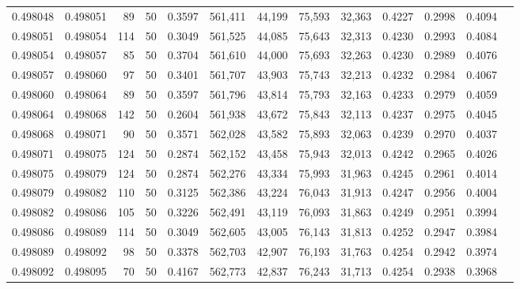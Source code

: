 \begin{tabular}{rrrrrrrrrrrrr}
0.498048 & 0.498051 &    89 &  50 &                                     0.3597 & 561,411 &  44,199 &  75,593 &  32,363 & 0.4227 & 0.2998 & 0.4094 \\
0.498051 & 0.498054 &   114 &  50 &                                     0.3049 & 561,525 &  44,085 &  75,643 &  32,313 & 0.4230 & 0.2993 & 0.4084 \\
0.498054 & 0.498057 &    85 &  50 &                                     0.3704 & 561,610 &  44,000 &  75,693 &  32,263 & 0.4230 & 0.2989 & 0.4076 \\
0.498057 & 0.498060 &    97 &  50 &                                     0.3401 & 561,707 &  43,903 &  75,743 &  32,213 & 0.4232 & 0.2984 & 0.4067 \\
0.498060 & 0.498064 &    89 &  50 &                                     0.3597 & 561,796 &  43,814 &  75,793 &  32,163 & 0.4233 & 0.2979 & 0.4059 \\
0.498064 & 0.498068 &   142 &  50 &                                     0.2604 & 561,938 &  43,672 &  75,843 &  32,113 & 0.4237 & 0.2975 & 0.4045 \\
0.498068 & 0.498071 &    90 &  50 &                                     0.3571 & 562,028 &  43,582 &  75,893 &  32,063 & 0.4239 & 0.2970 & 0.4037 \\
0.498071 & 0.498075 &   124 &  50 &                                     0.2874 & 562,152 &  43,458 &  75,943 &  32,013 & 0.4242 & 0.2965 & 0.4026 \\
0.498075 & 0.498079 &   124 &  50 &                                     0.2874 & 562,276 &  43,334 &  75,993 &  31,963 & 0.4245 & 0.2961 & 0.4014 \\
0.498079 & 0.498082 &   110 &  50 &                                     0.3125 & 562,386 &  43,224 &  76,043 &  31,913 & 0.4247 & 0.2956 & 0.4004 \\
0.498082 & 0.498086 &   105 &  50 &                                     0.3226 & 562,491 &  43,119 &  76,093 &  31,863 & 0.4249 & 0.2951 & 0.3994 \\
0.498086 & 0.498089 &   114 &  50 &                                     0.3049 & 562,605 &  43,005 &  76,143 &  31,813 & 0.4252 & 0.2947 & 0.3984 \\
0.498089 & 0.498092 &    98 &  50 &                                     0.3378 & 562,703 &  42,907 &  76,193 &  31,763 & 0.4254 & 0.2942 & 0.3974 \\
0.498092 & 0.498095 &    70 &  50 &                                     0.4167 & 562,773 &  42,837 &  76,243 &  31,713 & 0.4254 & 0.2938 & 0.3968 \\

\end{tabular}

